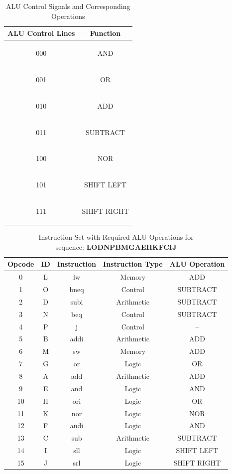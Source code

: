 \documentclass{article}
\begin{document}
\begin{table}[h]
\centering
\renewcommand{\arraystretch}{1.3}
\setlength{\tabcolsep}{12pt}

\begin{tabular}{|c|c|}
\hline
\textbf{ALU Control Lines} & \textbf{Function} \\
\hline
\hypertarget{alu_and}{000} & AND \\ \hline
\hypertarget{alu_or}{001} & OR \\ \hline
\hypertarget{alu_add}{010} & ADD \\ \hline
\hypertarget{alu_sub}{011} & SUBTRACT \\ \hline
\hypertarget{alu_nor}{100} & NOR \\ \hline
\hypertarget{alu_shift_left}{101} & SHIFT LEFT \\ \hline
\hypertarget{alu_shift_right}{111} & SHIFT RIGHT \\ \hline
\end{tabular}

\caption{ALU Control Signals and Corresponding Operations }
\end{table}

\begin{table}[h]
\centering
\renewcommand{\arraystretch}{1.3}
\setlength{\tabcolsep}{10pt}

\begin{tabular}{|c|c|c|c|c|}
\hline
\textbf{Opcode} & \textbf{ID} & \textbf{Instruction} & \textbf{Instruction Type} & \textbf{ALU Operation} \\ 
\hline
0  & L & lw   & Memory     & ADD \\ \hline
1  & O & bneq & Control    & SUBTRACT \\ \hline
2  & D & subi & Arithmetic & SUBTRACT \\ \hline
3  & N & beq  & Control    & SUBTRACT \\ \hline
4  & P & j    & Control    & -- \\ \hline
5  & B & addi & Arithmetic & ADD \\ \hline
6  & M & sw   & Memory     & ADD \\ \hline
7  & G & or   & Logic      & OR \\ \hline
8  & A & add  & Arithmetic & ADD \\ \hline
9  & E & and  & Logic      & AND \\ \hline
10 & H & ori  & Logic      & OR \\ \hline
11 & K & nor  & Logic      & NOR \\ \hline
12 & F & andi & Logic      & AND \\ \hline
13 & C & sub  & Arithmetic & SUBTRACT \\ \hline
14 & I & sll  & Logic      & SHIFT LEFT \\ \hline
15 & J & srl  & Logic      & SHIFT RIGHT \\ \hline
\end{tabular}

\caption{Instruction Set with Required ALU Operations for \\sequence: \textbf{LODNPBMGAEHKFCIJ}}
\end{table}
\end{document}
